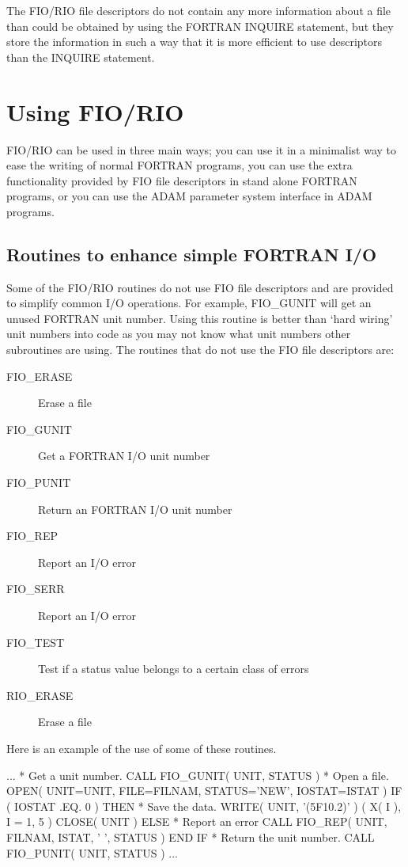 \documentclass[twoside,11pt,nolof]{starlink}
\begin{document}
The FIO/RIO file descriptors do not contain any more information about a file
than could be obtained by using the FORTRAN INQUIRE statement, but they store
the information in such a way that it is more efficient to use descriptors than
the INQUIRE statement.

\section{Using FIO/RIO}

FIO/RIO can be used in three main ways; you can use it in a minimalist way to
ease the writing of normal FORTRAN programs, you can use the extra
functionality provided by FIO file descriptors in stand alone FORTRAN programs,
or you can use the ADAM parameter system interface in ADAM programs.

\subsection{Routines to enhance simple FORTRAN I/O}

Some of the FIO/RIO routines do not use FIO file descriptors and are provided
to simplify common I/O operations. For example, FIO\_GUNIT will get an unused
FORTRAN unit number. Using this routine is better than `hard wiring' unit
numbers into code as you may not know what unit numbers other subroutines are
using. The routines that do not use the FIO file descriptors are:

\begin{description}
\item[FIO\_ERASE] Erase a file
\item[FIO\_GUNIT] Get a FORTRAN I/O unit number
\item[FIO\_PUNIT] Return an FORTRAN I/O unit number
\item[FIO\_REP]  Report an I/O error
\item[FIO\_SERR]  Report an I/O error
\item[FIO\_TEST]  Test if a status value belongs to a certain class of errors
\item[RIO\_ERASE] Erase a file
\end{description}

Here is an example of the use of some of these routines.

\begin{terminalv}
      ...
*  Get a unit number.
      CALL FIO_GUNIT( UNIT, STATUS )
*  Open a file.
      OPEN( UNIT=UNIT, FILE=FILNAM, STATUS='NEW', IOSTAT=ISTAT )
      IF ( IOSTAT .EQ. 0 ) THEN
*  Save the data.
         WRITE( UNIT, '(5F10.2)' ) ( X( I ), I = 1, 5 )
         CLOSE( UNIT )
      ELSE
*  Report an error
         CALL FIO_REP( UNIT, FILNAM, ISTAT, ' ', STATUS )
      END IF
*  Return the unit number.
      CALL FIO_PUNIT( UNIT, STATUS )
      ...
\end{terminalv}
\end{document}
